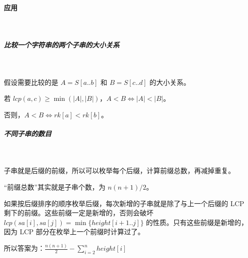 \paragraph{应用}~{}
\par
\subparagraph{比较一个字符串的两个子串的大小关系}~{}
\par
假设需要比较的是 $A=S[a..b]$ 和 $B=S[c..d]$ 的大小关系。\par
若 $lcp(a, c)\ge\min(|A|, |B|)$，$A<B\iff |A|<|B|$。\par
否则，$A<B\iff rk[a]< rk[b]$。\par

\subparagraph{不同子串的数目}~{}
\par
子串就是后缀的前缀，所以可以枚举每个后缀，计算前缀总数，再减掉重复。\par
“前缀总数”其实就是子串个数，为 $n(n+1)/2$。\par
如果按后缀排序的顺序枚举后缀，每次新增的子串就是除了与上一个后缀的 LCP 剩下的前缀。这些前缀一定是新增的，否则会破坏 $lcp(sa[i],sa[j])=\min\{height[i+1..j]\}$ 的性质。只有这些前缀是新增的，因为 LCP 部分在枚举上一个前缀时计算过了。\par
所以答案为：$\frac{n(n+1)}{2}-\sum\limits_{i=2}^nheight[i]$\par